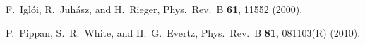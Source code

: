 \documentclass[twocolumn,superscriptaddress,prb,10pt]{revtex4-1}
\begin{document}
\begin{thebibliography}{99}


F.~Igl\'oi, R.~Juh\'asz, and H.~Rieger, Phys.\ Rev.\ B {\bf 61}, 11552 (2000).

P.~Pippan, S.~R.~White, and H.~G.~Evertz, Phys.\ Rev.\ B {\bf 81}, 081103(R) 
(2010). 

\end{thebibliography}
\end{document}
